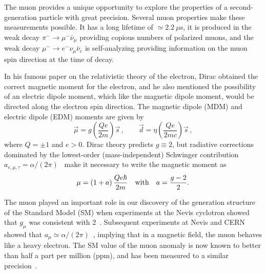 





The muon provides a unique opportunity to explore the properties of a
second-generation particle  with great precision. Several muon properties make
these measurements possible.  It has a long
lifetime of $\simeq 2.2~\mu$s,  it is produced in the weak decay
$\pi^- \rightarrow \mu^- \bar \nu_\mu$ providing copious numbers of
polarized muons, and the weak decay
$\mu^- \rightarrow e^- \nu_\mu \bar \nu_e $ is self-analyzing providing information on the muon spin direction at the time of decay.

In his famous paper on the relativistic theory of the electron,
Dirac\cite{Dirac28} obtained the correct magnetic moment for the
electron, and he also mentioned the possibility of an electric
 dipole moment, which like the magnetic dipole moment,
would be directed along the electron spin direction.
  The magnetic dipole (MDM) and electric dipole (EDM)
moments are given by
\begin{equation}
\vec \mu = g \left( \frac{Qe}{ 2m}\right) \vec s\, , \qquad
 \vec d = \eta  \left(\frac {Qe  }{ 2
     mc}\right)
\vec s \, ,
\label{eq:MDM-EDMdef}
\end{equation}
where  $Q =  \pm 1$ and $e>0$. Dirac theory predicts $g \equiv 2$,
but radiative corrections dominated by the
lowest-order (mass-independent) Schwinger contribution $a_{e,\mu,\tau} =
 \alpha/(2\pi)$~\cite{Schwinger48} make it necessary to
write the magnetic moment as
\begin{equation}
\mu = \left(1 + a\right)\frac{Qe \hbar }{ 2m}\quad {\rm with} \quad
a = \frac{{g - 2} }{ 2}.
\label{eq:muon-MDM}
\end{equation}

The muon played an important role in our discovery of the generation
structure of the Standard Model (SM) when
 experiments at the Nevis
cyclotron
showed  that $g_\mu$ was consistent with 2~\cite{Garwin57}.
Subsequent experiments at Nevis and CERN showed  that
$a_\mu \simeq \alpha/(2\pi)$~\cite{Garwin60,Charpak61},
implying that in a magnetic field, the muon
behaves like a heavy electron.
The SM value of the muon anomaly is now known
to better than half a part per million (ppm), and has
been measured to a similar precision~\cite{Bennett06}.


